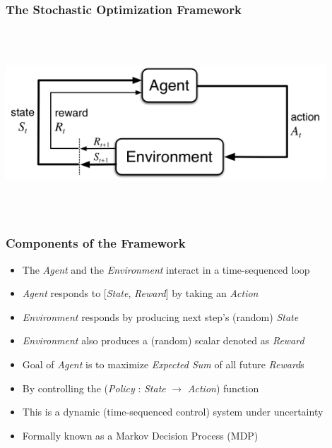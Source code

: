 \documentclass[handout]{beamer}
\begin{document}
\begin{frame}
\frametitle{The Stochastic Optimization Framework}
\includegraphics[width=12cm, height=7cm]{../finance/cme241/MDP.png}
\end{frame}

\begin{frame}
\frametitle{Components of the Framework}
\pause
\begin{itemize}[<+->]
\item The {\em Agent} and the {\em Environment} interact in a time-sequenced loop
\item {\em Agent} responds to [{\em State}, {\em Reward}] by taking an {\em Action}
\item {\em Environment} responds by producing next step's (random) {\em State}
\item {\em Environment} also produces a (random) scalar denoted as {\em Reward}
\item Goal of {\em Agent} is to maximize {\em Expected Sum} of all future {\em Reward}s
\item By controlling the ({\em Policy} : {\em State} $\rightarrow$ {\em Action}) function
\item This is a dynamic (time-sequenced control) system under uncertainty
\item Formally known as a Markov Decision Process (MDP)
\end{itemize}
\end{frame}
\end{document}
